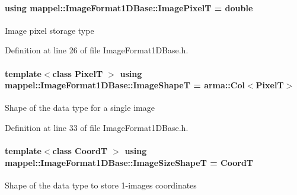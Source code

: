 \paragraph[{\texorpdfstring{Image\+PixelT}{ImagePixelT}}]{\setlength{\rightskip}{0pt plus 5cm}using {\bf mappel\+::\+Image\+Format1\+D\+Base\+::\+Image\+PixelT} =  double\hspace{0.3cm}{\ttfamily [inherited]}}\hypertarget{classmappel_1_1ImageFormat1DBase_a156fe500fd249cb4b77bdb0abc0dd0ea}{}\label{classmappel_1_1ImageFormat1DBase_a156fe500fd249cb4b77bdb0abc0dd0ea}
Image pixel storage type 

Definition at line 26 of file Image\+Format1\+D\+Base.\+h.

\paragraph[{\texorpdfstring{Image\+ShapeT}{ImageShapeT}}]{\setlength{\rightskip}{0pt plus 5cm}template$<$class PixelT $>$ using {\bf mappel\+::\+Image\+Format1\+D\+Base\+::\+Image\+ShapeT} =  arma\+::\+Col$<$PixelT$>$\hspace{0.3cm}{\ttfamily [inherited]}}\hypertarget{classmappel_1_1ImageFormat1DBase_a20d315459b83c348b1465614699783b3}{}\label{classmappel_1_1ImageFormat1DBase_a20d315459b83c348b1465614699783b3}
Shape of the data type for a single image 

Definition at line 33 of file Image\+Format1\+D\+Base.\+h.

\paragraph[{\texorpdfstring{Image\+Size\+ShapeT}{ImageSizeShapeT}}]{\setlength{\rightskip}{0pt plus 5cm}template$<$class CoordT $>$ using {\bf mappel\+::\+Image\+Format1\+D\+Base\+::\+Image\+Size\+ShapeT} =  CoordT\hspace{0.3cm}{\ttfamily [inherited]}}\hypertarget{classmappel_1_1ImageFormat1DBase_ab722bbd223963861691ef038721b6e02}{}\label{classmappel_1_1ImageFormat1DBase_ab722bbd223963861691ef038721b6e02}
Shape of the data type to store 1-\/image\textquotesingle{}s coordinates 

